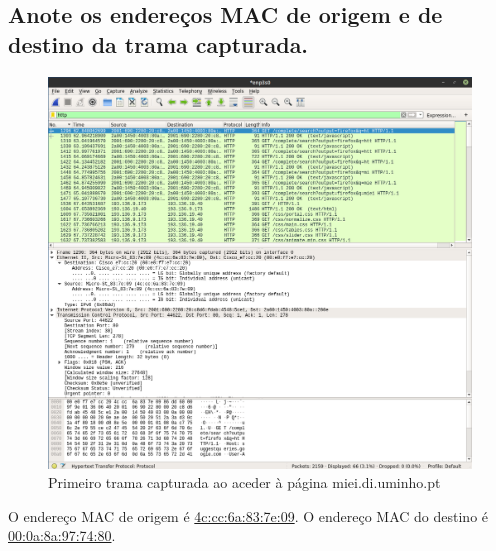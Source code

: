 \documentclass[a4paper]{article}
\begin{document}
 \subsection{Anote os endereços MAC de	origem e de	destino	da trama capturada.}
\begin{figure}[H]
\centering
\includegraphics[scale=0.30]{pics/wireshark-p1.png}
\caption{Primeiro trama capturada ao aceder à página miei.di.uminho.pt}
\end{figure}
 O endereço MAC de origem é \underline{4c:cc:6a:83:7e:09}.\newline
 O endereço MAC do destino é \underline{00:0a:8a:97:74:80}.
\end{document}
